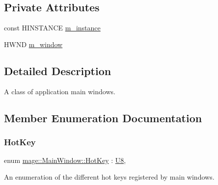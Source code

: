 \subsection*{Private Attributes}
\begin{DoxyCompactItemize}
\item 
const H\+I\+N\+S\+T\+A\+N\+CE \hyperlink{classmage_1_1_main_window_a51dabca0b0c06652e8bbe3350186a6f8}{m\+\_\+instance}
\item 
H\+W\+ND \hyperlink{classmage_1_1_main_window_abf84dff1d9634ec8ce4c12bae26cf98e}{m\+\_\+window}
\end{DoxyCompactItemize}


\subsection{Detailed Description}
A class of application main windows. 

\subsection{Member Enumeration Documentation}
\hypertarget{classmage_1_1_main_window_a3a6749d007d88da4fd966bafeef38ae1}{}\label{classmage_1_1_main_window_a3a6749d007d88da4fd966bafeef38ae1} 
\subsubsection{\texorpdfstring{Hot\+Key}{HotKey}}
{\footnotesize\ttfamily enum \hyperlink{classmage_1_1_main_window_a3a6749d007d88da4fd966bafeef38ae1}{mage\+::\+Main\+Window\+::\+Hot\+Key} \+: \hyperlink{namespacemage_afc638980bc6154f15af5e2d93a0e0ea9}{U8}\hspace{0.3cm}{\ttfamily [strong]}, {\ttfamily [private]}}

An enumeration of the different hot keys registered by main windows.

